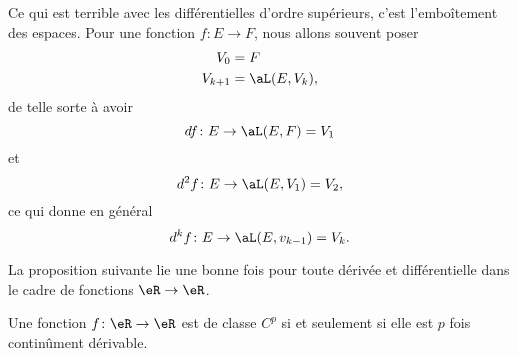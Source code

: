 Ce qui est terrible avec les différentielles d'ordre supérieurs, c'est l'emboîtement des espaces. Pour une fonction \( f\colon E\to F\), nous allons souvent poser
\begin{subequations}
    \begin{align}
        V_0&=F\\
        V_{k+1}&=\aL(E,V_k),
    \end{align}
\end{subequations}
de telle sorte à avoir
\begin{equation}
    df\colon E\to \aL(E,F)=V_1
\end{equation}
et 
\begin{equation}
    d^2f\colon E\to \aL(E,V_1)=V_2,
\end{equation}
ce qui donne en général
\begin{equation}
    d^kf\colon E\to \aL(E,v_{k-1})=V_k.
\end{equation}

La proposition suivante lie une bonne fois pour toute dérivée et différentielle dans le cadre de fonctions \( \eR\to \eR\).
\begin{proposition}      \label{PROPooCNDHooKRwils}
    Une fonction \( f\colon \eR\to \eR\) est de classe \( C^p\) si et seulement si elle est \( p\) fois continûment dérivable.
\end{proposition}

